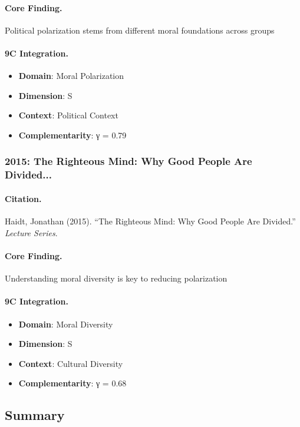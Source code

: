 \paragraph{Core Finding.}
Political polarization stems from different moral foundations across groups

\paragraph{9C Integration.}
\begin{itemize}[nosep]
  \item \textbf{Domain}: Moral Polarization
  \item \textbf{Dimension}: S
  \item \textbf{Context}: Political Context
  \item \textbf{Complementarity}: γ = 0.79
\end{itemize}

\subsubsection{2015: The Righteous Mind: Why Good People Are Divided...}

\paragraph{Citation.}
Haidt, Jonathan (2015). ``The Righteous Mind: Why Good People Are Divided.''
\textit{Lecture Series}.

\paragraph{Core Finding.}
Understanding moral diversity is key to reducing polarization

\paragraph{9C Integration.}
\begin{itemize}[nosep]
  \item \textbf{Domain}: Moral Diversity
  \item \textbf{Dimension}: S
  \item \textbf{Context}: Cultural Diversity
  \item \textbf{Complementarity}: γ = 0.68
\end{itemize}

\subsection{Summary}


